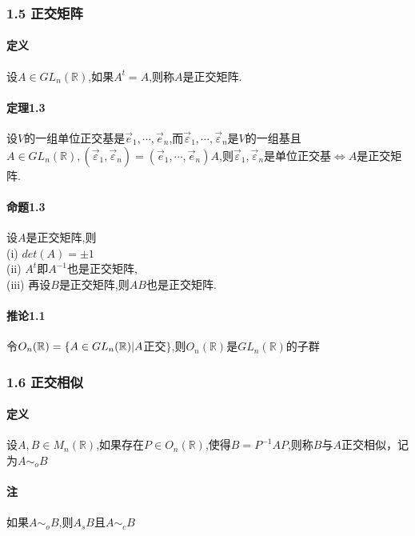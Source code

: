 \documentclass{ctexart}
\begin{document}
\subsubsection{1.5 正交矩阵}

\paragraph{定义}
设$A \in GL_{n}(\mathbb{R})$,如果$A^{t}=A$,则称$A$是正交矩阵.

\paragraph{定理1.3}
设$V$的一组单位正交基是$\vec{e}_{1}, \cdots ,\vec{e}_{n}$,而$\vec{\varepsilon}_{1},\cdots ,\vec{\varepsilon}_{n}$是$V$的一组基且$A \in GL_{n}(\mathbb{R}),(\vec{\varepsilon}_{1},\vec{\varepsilon}_{n})=(\vec{e}_{1},\cdots ,\vec{e}_{n})A$,则$\vec{\varepsilon}_{1},\vec{\varepsilon}_{n}$是单位正交基$\Leftrightarrow A$是正交矩阵.

\paragraph{命题1.3}
设$A$是正交矩阵,则\\
(i) $det(A)=\pm1$\\
(ii) $A^{t}$即$A^{-1}$也是正交矩阵,\\
(iii) 再设$B$是正交矩阵,则$AB$也是正交矩阵.\\

\paragraph{推论1.1}
令$O_{n}(\mathbb{R})=\{A \in GL_{n}(\mathbb{R}) \arrowvert A$正交$\}$,则$O_{n}(\mathbb{R})$是$GL_{n}(\mathbb{R})$的子群
\subsubsection{1.6 正交相似}
\paragraph{定义}
设$A,B \in M_{n}(\mathbb{R})$,如果存在$P \in O_{n}(\mathbb{R})$,使得$B = P^{-1}AP$,则称$B$与$A$正交相似，记为$A\sim_{o}B$

\paragraph{注}
如果$A\sim_{o}B$,则$A_{s}B$且$A\sim_{c}B$
\end{document}
